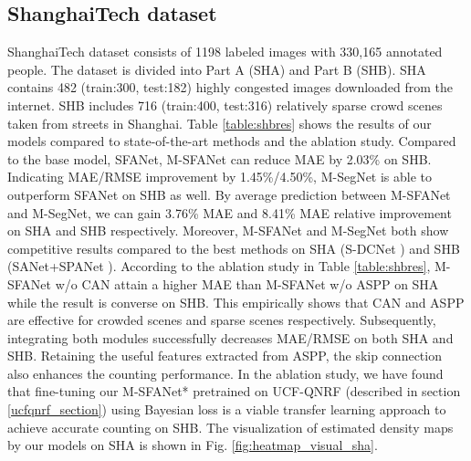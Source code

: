\documentclass[10pt, conference, a4paper]{IEEEtran}
\begin{document}
\subsection{ShanghaiTech dataset}
ShanghaiTech \cite{zhang2016single} dataset consists of 1198 labeled images with 330,165 annotated people. The dataset is divided into Part A (SHA) and Part B (SHB). SHA contains 482 (train:300, test:182) highly congested images downloaded from the internet. SHB includes 716 (train:400, test:316) relatively sparse crowd scenes taken from streets in Shanghai. Table \ref{table:shbres} shows the results of our models compared to state-of-the-art methods and the ablation study. Compared to the base model, SFANet, M-SFANet can reduce MAE by 2.03\% on SHB. Indicating MAE/RMSE improvement by 1.45\%/4.50\%, M-SegNet is able to outperform SFANet on SHB as well. By average prediction between M-SFANet and M-SegNet, we can gain 3.76\% MAE and 8.41\% MAE relative improvement on SHA and SHB respectively. Moreover, M-SFANet and M-SegNet both show competitive results compared to the best methods on SHA (S-DCNet \cite{xiong2019open}) and SHB (SANet+SPANet \cite{cheng2019learning}). According to the ablation study in Table \ref{table:shbres}, M-SFANet w/o CAN attain a higher MAE than M-SFANet w/o ASPP on SHA while the result is converse on SHB. This empirically shows that CAN and ASPP are effective for crowded scenes and sparse scenes respectively. Subsequently, integrating both modules successfully decreases MAE/RMSE on both SHA and SHB. Retaining the useful features extracted from ASPP, the skip connection also enhances the counting performance. In the ablation study, we have found that fine-tuning our M-SFANet* pretrained on UCF-QNRF (described in section \ref{ucfqnrf_section}) using Bayesian loss \cite{ma2019bayesian} is a viable transfer learning approach to achieve accurate counting on SHB. The visualization of estimated density maps by our models on SHA is shown in Fig. \ref{fig:heatmap_visual_sha}.
\label{SH_discussion}
\end{document}

